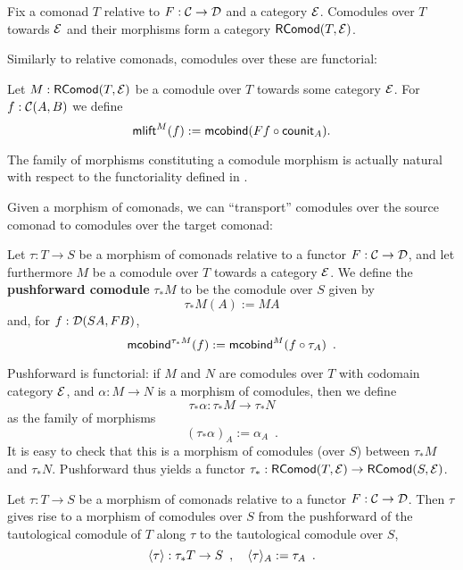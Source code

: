 \documentclass[conference,10pt]{IEEEtran}
\newcommand{\fat}[1]{\textbf{#1}}
\begin{document}
\begin{remark}
 Fix a comonad $T$ relative to $F:\C\to\D$ and a category $\E$.
 Comodules over $T$ towards $\E$ and their morphisms  form a category $\RComod(T,\E)$.
\end{remark}

Similarly to relative comonads, comodules over these are functorial:

\begin{definition}\label{def:comodule_lift}
 Let $M : \RComod(T,\E)$ be a comodule over $T$ towards some category $\E$. For $f : \C(A,B)$ we define
  \[ \mlift^M(f) := \mcobind(\comp{\counit_A}{Ff}) .  \]
\end{definition}


\begin{remark}
  The family of morphisms constituting a comodule morphism is actually natural with respect to the functoriality 
  defined in .
\end{remark}

Given a morphism of comonads, we can \enquote{transport} comodules over the source comonad to comodules over the target comonad:


\begin{definition}\label{def:pushforward_comodule} %
  Let $\tau : T\to S$ be a morphism of comonads relative to a functor $F : \C \to \D$, and let furthermore $M$ be a 
  comodule over $T$ towards a category $\E$. We define the \fat{pushforward comodule} $\tau_*M$ to be the comodule over $S$ given by
  \[  \tau_*M(A) := MA \]
  and, for $f : \D(SA,FB)$,
   \[ \mcobind^{\tau_*M}(f) := \mcobind^M(\comp{\tau_A}{f}) \enspace . \]
   
  \noindent
  Pushforward is functorial: if $M$ and $N$ are comodules over $T$ with codomain category $\E$, and $\alpha : M\to N$ is 
    a morphism of comodules, then we define \[\tau_*\alpha : \tau_*M \to \tau_*N\] 
    as the family of morphisms
     \[ (\tau_*\alpha)_A := \alpha_A \enspace . \]
  It is easy to check that this is a morphism of comodules (over $S$) between $\tau_*M$ and $\tau_*N$.
  Pushforward thus yields a functor $\tau_*:\RComod(T,\E) \to \RComod(S,\E)$.
\end{definition}


\begin{definition}\label{def:induced} %
  Let $\tau : T\to S$ be a morphism of comonads relative to a functor $F : \C \to \D$.
  Then $\tau$ gives rise to a morphism of comodules over $S$ from the pushforward of the tautological comodule
  of $T$ along $\tau$ to the tautological comodule over $S$,
  \[ \induced{\tau} : \tau_*T \to S \enspace , \quad \induced{\tau}_A := \tau_A \enspace . \]
\end{definition}
\end{document}
